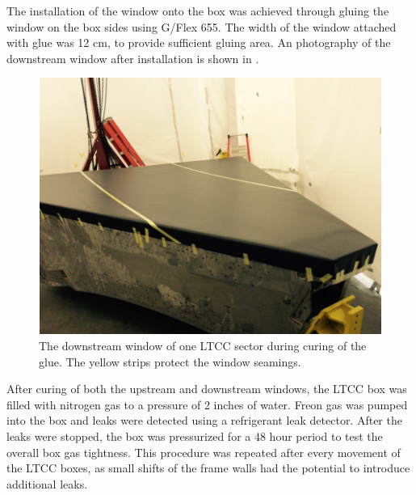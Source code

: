 The installation of the window onto the box was achieved through gluing the window on the box sides using G/Flex 655. The width of the window
attached with glue was 12 cm, to provide sufficient gluing area.
An photography of the downstream window after installation is shown in .

\begin{figure}
	\centering
	\includegraphics[width=1.0\columnwidth,keepaspectratio]{img/downstreamWindow.png}
	\caption{The downstream window of one LTCC sector during curing of the glue. The yellow strips protect the window seamings.}
	\label{fig:downstreamWindow}
\end{figure}

After curing of both the upstream and downstream windows, the LTCC box was filled with nitrogen gas to a pressure of 2 inches of water.
Freon gas was pumped into the box and leaks were detected using a refrigerant leak detector. After the leaks were stopped, the box was pressurized
for a 48 hour period to test the overall box gas tightness. This procedure was repeated after every movement of the LTCC boxes, as small
shifts of the frame walls had the potential to introduce additional leaks.

